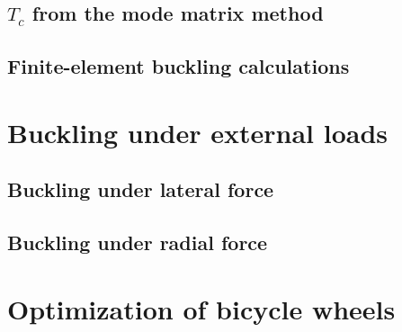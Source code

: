 \documentclass{nuthesis}
\begin{document}
\section{$T_c$ from the mode matrix method}
\section{Finite-element buckling calculations}


\chapter{Buckling under external loads}
\section{Buckling under lateral force}
\section{Buckling under radial force}


\chapter{Optimization of bicycle wheels}
\end{document}
